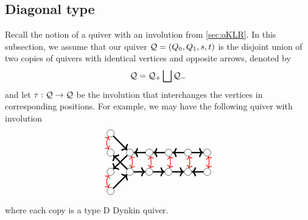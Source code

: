 \subsection{Diagonal type}
\label{sec:diagnoal}
Recall the notion of a quiver with an involution from \cref{sec:oKLR}. In this subsection, we assume that our quiver $\Qui=(Q_0,Q_1,s,t)$ is the disjoint union of two
 copies of quivers with identical vertices and opposite arrows, denoted by
\[
\mathcal{Q}=\mathcal{Q}_{+}\bigsqcup \mathcal{Q}_{-}
\]
and let $\tau :\Qui\to\Qui$  be the involution that interchanges
the vertices in corresponding positions. For example, we may have the following quiver with involution
$$
\begin{tikzpicture}[
  scale=.8,
  every node/.style={circle, draw, inner sep=3pt},
  arrow/.style={red, <->, thick}
]

\node (t1) at (-1,1) {};   %
\node (t2) at (0,0) {};   %
\node (t3) at (-1,-1) {};  %
\node (t4) at (1,0) {};
\node (t5) at (2,0) {};
\node (t6) at (3,0) {};
\node (t7) at (4,0) {};

\draw[->,ultra thick] (t1) -- (t2); 
\draw[->,ultra thick] (t2) -- (t3);
\draw[<-,ultra thick] (t2) -- (t4);
\draw[<-,ultra thick] (t4) -- (t5);
\draw[<-,ultra thick] (t5) -- (t6);
\draw[->,ultra thick] (t6) -- (t7);

\node (b1) at (-1,0) {};   %
\node (b2) at (0,-1) {};   %
\node (b3) at (-1,-2) {};   %
\node (b4) at (1,-1) {};
\node (b5) at (2,-1) {};
\node (b6) at (3,-1) {};
\node (b7) at (4,-1) {};


\draw[<-,ultra thick] (b1) -- (b2);
\draw[<-,ultra thick] (b2) -- (b3);
\draw[->,ultra thick] (b2) -- (b4);
\draw[->,ultra thick] (b4) -- (b5);
\draw[->,ultra thick] (b5) -- (b6);
\draw[<-,ultra thick] (b6) -- (b7);

\draw[arrow] (t1) to[bend right=30] (b1);
\draw[arrow] (t2) to[bend left=20] (b2);
\draw[arrow] (t3) to[bend right=30] (b3);
\draw[arrow] (t4) to[bend left=15] (b4);
\draw[arrow] (t5) to[bend left=15] (b5);
\draw[arrow] (t6) to[bend left=15] (b6);
\draw[arrow] (t7) to[bend left=15] (b7);

\end{tikzpicture}$$
where each copy is a type D Dynkin quiver.

